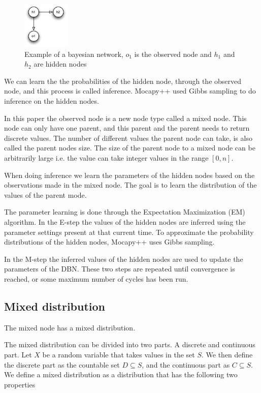 \documentclass[10pt, journal, compsoc, a4paper]{IEEEtran}
\begin{document}
\begin{figure}[ht]
\centering
\includegraphics[width=0.2\textwidth]{figures/fig2.pdf}
\caption{Example of a bayesian network, $o_1$ is the observed node and $h_1$ and $h_2$ are hidden nodes}
\label{fig2}
\end{figure}

We can learn the the probabilities of the hidden node, through the observed node, and this process is called inference. Mocapy++ used Gibbs sampling to do inference on the hidden nodes. 

In this paper the observed node is a new node type called a mixed node. This node can only have one parent, and this parent and the parent needs to return discrete values. The number of different values the parent node can take, is also called the parent nodes size. The size of the parent node to a mixed node can be arbitrarily large i.e. the value can take integer values in the range $[0,n]$.

When doing inference we learn the parameters of the hidden nodes based on the observations made in the mixed node. The goal is to learn the distribution of the values of the parent mode. 

The parameter learning is done through the Expectation Maximization (EM) algorithm. In the E-step the values of the hidden nodes are inferred using the parameter settings present at that current time. To approximate the probability distributions of the hidden nodes, Mocapy++ uses Gibbs sampling.

In the M-step the inferred values of the hidden nodes are used to update the parameters of the DBN. These two steps are repeated until convergence is reached, or some maximum number of cycles has been run. 


\subsection{Mixed distribution} %
\label{sub:mixed_distribution}
The mixed node has a mixed distribution.

The mixed distribution can be divided into two parts. A discrete and continuous part. Let $X$ be a random variable that takes values in the set $S$. We then define the discrete part as the countable set $D \subseteq S$, and the continuous part as $C \subseteq S$. We define a mixed distribution as a distribution that has the following two properties
\end{document}
